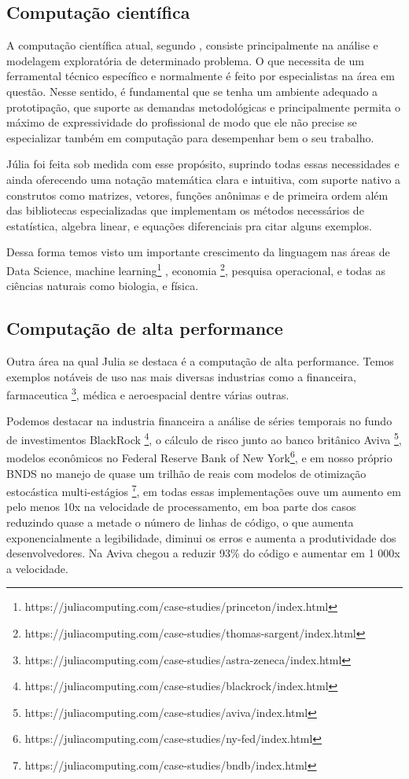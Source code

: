 \subsection{Computação científica}

A computação científica atual, segundo \cite{Kaw2000,Wilson2014,Perez2007}, consiste principalmente na análise e modelagem exploratória de determinado problema. O que necessita de um ferramental técnico específico e normalmente é feito por especialistas na área em questão. Nesse sentido, é fundamental que se tenha um ambiente adequado a prototipação, que suporte as demandas metodológicas e principalmente permita o máximo de expressividade do profissional de modo que ele não precise se especializar também em computação para desempenhar bem o seu trabalho. 

Júlia foi feita sob medida com esse propósito, suprindo todas essas necessidades e ainda oferecendo uma notação matemática clara e intuitiva, com suporte nativo a construtos como matrizes, vetores, funções anônimas e de primeira ordem além das bibliotecas especializadas que implementam os métodos necessários de estatística, algebra linear, e equações diferenciais pra citar alguns exemplos. \cite{Klok2021}

Dessa forma temos visto um importante crescimento da linguagem nas áreas de Data Science, machine learning\footnote{https://juliacomputing.com/case-studies/princeton/index.html} \cite{JC_ML}, economia \cite{Sargent2016}\footnote{https://juliacomputing.com/case-studies/thomas-sargent/index.html}, pesquisa operacional, e todas as ciências naturais como biologia, e física. \cite{Perkel2019,Udell2014}

\subsection{Computação de alta performance}
Outra área na qual Julia se destaca é a computação de alta performance. Temos exemplos notáveis de uso nas mais diversas industrias como a financeira, farmaceutica \cite{Semenova2020} \footnote{https://juliacomputing.com/case-studies/astra-zeneca/index.html}, médica e aeroespacial dentre várias outras. 

Podemos destacar na industria financeira a análise de séries temporais no fundo de investimentos BlackRock \cite{JC_BlackRock} \footnote{https://juliacomputing.com/case-studies/blackrock/index.html}, o cálculo de risco junto ao banco britânico Aviva \cite{Thornham2018} \footnote{https://juliacomputing.com/case-studies/aviva/index.html}, modelos econômicos no Federal Reserve Bank of New York\footnote{https://juliacomputing.com/case-studies/ny-fed/index.html}, e em nosso próprio BNDS no manejo de quase um trilhão de reais com modelos de otimização estocástica multi-estágios \cite{Noronha2017}\footnote{https://juliacomputing.com/case-studies/bndb/index.html}, em todas essas implementações ouve um aumento em pelo menos 10x na velocidade de processamento, em boa parte dos casos reduzindo quase a metade o número de linhas de código, o que aumenta exponencialmente a legibilidade, diminui os erros e aumenta a produtividade dos desenvolvedores. Na Aviva chegou a reduzir 93\% do código e aumentar em 1 000x a velocidade. 

